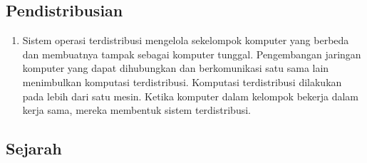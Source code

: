 \subsection{Pendistribusian}
	\begin{enumerate}
		\item Sistem operasi terdistribusi mengelola sekelompok komputer yang berbeda dan membuatnya tampak sebagai komputer tunggal. Pengembangan jaringan komputer yang dapat dihubungkan dan berkomunikasi satu sama lain menimbulkan komputasi terdistribusi. Komputasi terdistribusi dilakukan pada lebih dari satu mesin. Ketika komputer dalam kelompok bekerja dalam kerja sama, mereka membentuk sistem terdistribusi.
	\end{enumerate}
\subsection{Sejarah}
